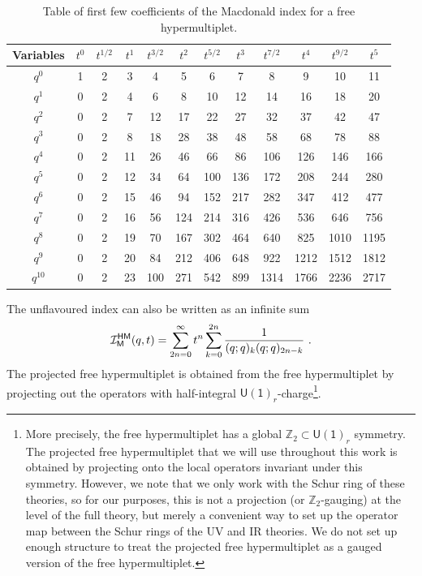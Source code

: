 \documentclass[a4paper,10pt]{article}
\newcommand{\mr}[1]{\mathsf{#1}}
\newcommand{\tsf}[1]{\textsf{#1}}
\def\CI {{\cal I}}
\def\CI {{{\cal I}}}
\begin{document}
\begin{table}[h]
    \centering
    \begin{tabular}{|c|ccccccccccc|}
    \hline
   Variables & $t^0$ & $t^{1/2}$ 
    & $t^{1}$ & $t^{3/2}$
    & $t^{2}$ & $t^{5/2}$
    & $t^{3}$ & $t^{7/2}$
    & $t^{4}$ & $t^{9/2}$
    & $t^{5}$ \\
    \hline
 $q^{0}$ &1 & 2 & 3 & 4 & 5 & 6 & 7 & 8 & 9 & 10 & 11 \\
 $q^{1}$ &0 & 2 & 4 & 6 & 8 & 10 & 12 & 14 & 16 & 18 & 20 \\
 $q^{2}$ &0 & 2 & 7 & 12 & 17 & 22 & 27 & 32 & 37 & 42 & 47 \\
 $q^{3}$ &0 & 2 & 8 & 18 & 28 & 38 & 48 & 58 & 68 & 78 & 88 \\
 $q^{4}$ &0 & 2 & 11 & 26 & 46 & 66 & 86 & 106 & 126 & 146 & 166 \\
 $q^{5}$ &0 & 2 & 12 & 34 & 64 & 100 & 136 & 172 & 208 & 244 & 280 \\
 $q^{6}$ &0 & 2 & 15 & 46 & 94 & 152 & 217 & 282 & 347 & 412 & 477 \\
 $q^{7}$ &0 & 2 & 16 & 56 & 124 & 214 & 316 & 426 & 536 & 646 & 756 \\
 $q^{8}$ &0 & 2 & 19 & 70 & 167 & 302 & 464 & 640 & 825 & 1010 & 1195 \\
 $q^{9}$ &0 & 2 & 20 & 84 & 212 & 406 & 648 & 922 & 1212 & 1512 & 1812 \\
 $q^{10}$ &0 & 2 & 23 & 100 & 271 & 542 & 899 & 1314 & 1766 & 2236 & 2717 \\\hline
\end{tabular}
\caption{Table of first few coefficients of the Macdonald index for a free hypermultiplet.}
\label{tab:coeff_mac_FH}
\end{table}
The unflavoured index can also be written as an infinite sum
\begin{equation}
    \CI_{\mr{M}}^{\mr{HM}}(q,t)=\sum_{2 n=0}^{\infty} t^n \sum_{k=0}^{2 n} \frac{1}{(q ; q)_k(q ; q)_{2 n-k}}~.
\end{equation}
The projected free hypermultiplet is obtained from the free hypermultiplet by projecting out the operators with half-integral $\mr{U(1)}_r$-charge\footnote{\label{foot:proj_hyper}More precisely, the free hypermultiplet has a global $\mathds{Z}_2\subset \mr{U(1)}_r$ symmetry. The projected free hypermultiplet that we will use throughout this work is obtained by projecting onto the local operators invariant under this symmetry. However, we note that we only work with the Schur ring of these theories, so for our purposes, this is not a projection (or $\mathds{Z}_2$-gauging) at the level of the full theory, but merely a convenient way to set up the operator map between the Schur rings of the \tsf{UV} and \tsf{IR} theories. We do not set up enough structure to treat the projected free hypermultiplet as a gauged version of the free hypermultiplet.}.
\end{document}

